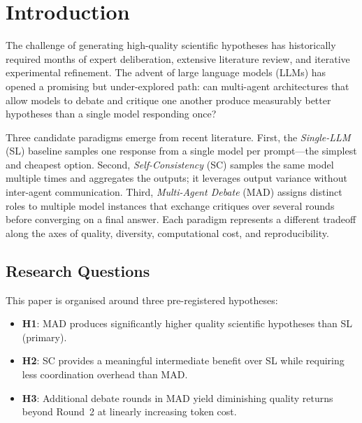 
\section{Introduction}
\label{sec:intro}

The challenge of generating high-quality scientific hypotheses has historically
required months of expert deliberation, extensive literature review, and iterative
experimental refinement.  The advent of large language models (LLMs) has opened a
promising but under-explored path: can multi-agent architectures that allow models
to debate and critique one another produce measurably better hypotheses than a
single model responding once?

Three candidate paradigms emerge from recent literature.  First, the
\emph{Single-LLM} (SL) baseline samples one response from a single model per
prompt---the simplest and cheapest option.  Second, \emph{Self-Consistency} (SC)
\cite{Wang2022} samples the same model multiple times and aggregates the outputs;
it leverages output variance without inter-agent communication.  Third,
\emph{Multi-Agent Debate} (MAD) \cite{Du2024} assigns distinct roles to multiple
model instances that exchange critiques over several rounds before converging on a
final answer.  Each paradigm represents a different tradeoff along the axes of
quality, diversity, computational cost, and reproducibility.

\subsection*{Research Questions}

This paper is organised around three pre-registered hypotheses:
\begin{itemize}
  \item \textbf{H1}: MAD produces significantly higher quality scientific
    hypotheses than SL (primary).
  \item \textbf{H2}: SC provides a meaningful intermediate benefit over SL while
    requiring less coordination overhead than MAD.
  \item \textbf{H3}: Additional debate rounds in MAD yield diminishing quality
    returns beyond Round~2 at linearly increasing token cost.
\end{itemize}

